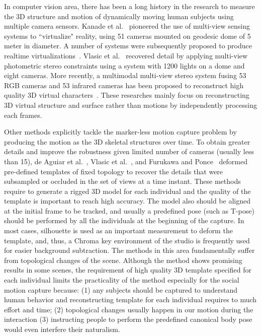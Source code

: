 In computer vision area, there has been a long history in the research to measure the 3D structure and motion of dynamically moving human subjects using multiple camera sensors. Kanade et al.~\cite{Kanade-1997} pioneered the use of multi-view sensing systems to ``virtualize" reality, using 51 cameras mounted on geodesic dome of 5 meter in diameter. A number of systems were subsequently proposed to produce realtime virtualizations~\cite{Matusik-2000,Matsuyama-2002,Gross-2003,Petit-2009}. Vlasic et al.~\cite{Vlasic-2009} recovered detail by applying multi-view photometric stereo constraints using a system with 1200 lights on a dome and eight cameras. More recently, a multimodal multi-view stereo system fusing 53 RGB cameras and 53 infrared cameras has been proposed to reconstruct high quality 3D virtual characters~\cite{Collet-15}. These researches mainly focus on reconstructing 3D virtual structure and surface rather than motions by independently processing each frames.

Other methods explicitly tackle the marker-less motion capture problem by producing the motion as the 3D skeletal structures over time. To obtain greater details and improve the robustness given limited number of cameras (usually less than 15), de Aguiar et al.~\cite{deAguiar-2008}, Vlasic et al.~\cite{Vlasic-2008}, and Furukawa and Ponce~\cite{Furukawa-2008} deformed pre-defined templates of fixed topology to recover the details that were subsampled or occluded in the set of views at a time instant. These methods require to generate a rigged 3D model for each individual and the quality of the template is important to reach high accuracy. The model also should be aligned at the initial frame to be tracked, and usually a predefined pose (such as T-pose) should be performed by all the individuals at the beginning of the capture. In most cases, silhouette is used as an important measurement to deform the template, and, thus, a Chroma key environment of the studio is frequently used for easier background subtraction. The methods in this area fundamentally suffer from topological changes of the scene. Although the method shows promising results in some scenes, the requirement of high quality 3D template specified for each individual limits the practicality of the method especially for the social motion capture because: (1) any subjects should be captured to understand human behavior and reconstructing template for each individual requires to much effort and time; (2) topological changes usually happen in our motion during the interaction (3) instructing people to perform the predefined canonical body pose would even interfere their naturalism. 

